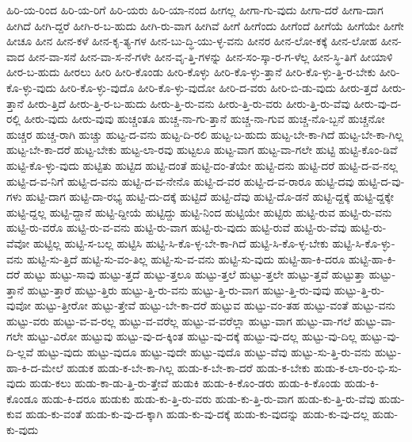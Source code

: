 {ಹಿರಿ-ಯ-ರಿಂದ
ಹಿರಿ-ಯ-ರಿಗೆ
ಹಿರಿ-ಯರು
ಹಿರಿ-ಯಾ-ನಂದ
ಹೀಗಲ್ಲ
ಹೀಗಾ-ಗು-ವುದು
ಹೀಗಾ-ದರೆ
ಹೀಗಾ-ದಾಗ
ಹೀಗಿದೆ
ಹೀಗಿ-ದ್ದರೆ
ಹೀಗಿ-ರ-ಬ-ಹುದು
ಹೀಗಿ-ರು-ವಾಗ
ಹೀಗಿವೆ
ಹೀಗೆ
ಹೀಗೆಂದು
ಹೀಗೆಂದೆ
ಹೀಗೆಯೆ
ಹೀಗೆಯೇ
ಹೀಗೇ
ಹೀಚೂ
ಹೀನ
ಹೀನ-ಕಳೆ
ಹೀನ-ಕೃ-ತ್ಯ-ಗಳ
ಹೀನ-ಬು-ದ್ಧಿ-ಯು-ಳ್ಳ-ವನು
ಹೀನರ
ಹೀನ-ಲೋ-ಕಕ್ಕೆ
ಹೀನ-ಲೋಹ
ಹೀನ-ವಾದ
ಹೀನ-ವಾ-ಸನೆ
ಹೀನ-ವಾ-ಸ-ನೆ-ಗಳೇ
ಹೀನ-ವೃ-ತ್ತಿ-ಗಳನ್ನು
ಹೀನ-ಸಂ-ಸ್ಕಾ-ರ-ಗ-ಳೆಲ್ಲ
ಹೀನ-ಸ್ಥಿ-ತಿಗೆ
ಹೀಯಾಳಿ
ಹೀರ-ಬ-ಹುದು
ಹೀರಲು
ಹೀರಿ
ಹೀರಿ-ಕೊಂಡು
ಹೀರಿ-ಕೊಳ್ಳು
ಹೀರಿ-ಕೊ-ಳ್ಳು-ತ್ತಾನೆ
ಹೀರಿ-ಕೊ-ಳ್ಳು-ತ್ತಿ-ರ-ಬೇಕು
ಹೀರಿ-ಕೊ-ಳ್ಳು-ವುದು
ಹೀರಿ-ಕೊ-ಳ್ಳು-ವುದೊ
ಹೀರಿ-ಕೊ-ಳ್ಳು-ವುದೋ
ಹೀರಿ-ದ-ವರು
ಹೀರಿ-ಬಿ-ಡು-ವುದು
ಹೀರು-ತ್ತದೆ
ಹೀರು-ತ್ತಾನೆ
ಹೀರು-ತ್ತಿದೆ
ಹೀರು-ತ್ತಿ-ರ-ಬ-ಹುದು
ಹೀರು-ತ್ತಿ-ರು-ವನು
ಹೀರು-ತ್ತಿ-ರು-ವರು
ಹೀರು-ತ್ತಿ-ರು-ವೆವು
ಹೀರು-ವು-ದ-ರಲ್ಲಿ
ಹೀರು-ವುದು
ಹೀರು-ವುವು
ಹುಚ್ಚಂತೂ
ಹುಚ್ಚ-ನಾ-ಗು-ತ್ತಾನೆ
ಹುಚ್ಚ-ನಾ-ಗುವ
ಹುಚ್ಚ-ನೊ-ಬ್ಬನೆ
ಹುಚ್ಚನೋ
ಹುಚ್ಚರ
ಹುಚ್ಚ-ರಾಗಿ
ಹುಚ್ಚು
ಹುಟ್ಟ-ದ-ವನು
ಹುಟ್ಟ-ದಿ-ರಲಿ
ಹುಟ್ಟ-ಬ-ಹುದು
ಹುಟ್ಟ-ಬೇ-ಕಾ-ಗಿದೆ
ಹುಟ್ಟ-ಬೇ-ಕಾ-ಗಿಲ್ಲ
ಹುಟ್ಟ-ಬೇ-ಕಾ-ದರೆ
ಹುಟ್ಟ-ಬೇಕು
ಹುಟ್ಟ-ಲಾ-ರವು
ಹುಟ್ಟಲೂ
ಹುಟ್ಟ-ವಾಗ
ಹುಟ್ಟ-ವಾ-ಗಲೇ
ಹುಟ್ಟಿ
ಹುಟ್ಟಿ-ಕೊಂ-ಡಿವೆ
ಹುಟ್ಟಿ-ಕೊ-ಳ್ಳು-ವುದು
ಹುಟ್ಟಿತು
ಹುಟ್ಟಿದ
ಹುಟ್ಟಿ-ದಂತೆ
ಹುಟ್ಟಿ-ದಂ-ತೆಯೇ
ಹುಟ್ಟಿ-ದನು
ಹುಟ್ಟಿ-ದರೆ
ಹುಟ್ಟಿ-ದ-ವ-ನಲ್ಲ
ಹುಟ್ಟಿ-ದ-ವ-ನಿಗೆ
ಹುಟ್ಟಿ-ದ-ವನು
ಹುಟ್ಟಿ-ದ-ವ-ನೇನೊ
ಹುಟ್ಟಿ-ದ-ವರ
ಹುಟ್ಟಿ-ದ-ವ-ರಾರೂ
ಹುಟ್ಟಿ-ದವು
ಹುಟ್ಟಿ-ದ-ವು-ಗಳು
ಹುಟ್ಟಿ-ದಾಗ
ಹುಟ್ಟಿ-ದಾ-ರಭ್ಯ
ಹುಟ್ಟಿ-ದು-ದಕ್ಕೆ
ಹುಟ್ಟಿದೆ
ಹುಟ್ಟಿ-ದೆವು
ಹುಟ್ಟಿ-ದೊ-ಡನೆ
ಹುಟ್ಟಿ-ದ್ದಕ್ಕೆ
ಹುಟ್ಟಿ-ದ್ದಕ್ಕೇ
ಹುಟ್ಟಿ-ದ್ದಲ್ಲ
ಹುಟ್ಟಿ-ದ್ದಾನೆ
ಹುಟ್ಟಿ-ದ್ದೀಯೆ
ಹುಟ್ಟಿದ್ದು
ಹುಟ್ಟಿ-ನಿಂದ
ಹುಟ್ಟಿಯೇ
ಹುಟ್ಟಿರು
ಹುಟ್ಟಿ-ರುವ
ಹುಟ್ಟಿ-ರು-ವನು
ಹುಟ್ಟಿ-ರು-ವರೊ
ಹುಟ್ಟಿ-ರು-ವ-ವನು
ಹುಟ್ಟಿ-ರು-ವಾಗ
ಹುಟ್ಟಿ-ರು-ವುದು
ಹುಟ್ಟಿ-ರುವೆ
ಹುಟ್ಟಿ-ರು-ವೆವು
ಹುಟ್ಟಿ-ರು-ವೆವೋ
ಹುಟ್ಟಿಲ್ಲ
ಹುಟ್ಟಿ-ಸ-ಬಲ್ಲ
ಹುಟ್ಟಿಸಿ
ಹುಟ್ಟಿ-ಸಿ-ಕೊ-ಳ್ಳ-ಬೇ-ಕಾ-ಗಿದೆ
ಹುಟ್ಟಿ-ಸಿ-ಕೊ-ಳ್ಳ-ಬೇಕು
ಹುಟ್ಟಿ-ಸಿ-ಕೊ-ಳ್ಳು-ವನು
ಹುಟ್ಟಿ-ಸು-ತ್ತಿದೆ
ಹುಟ್ಟಿ-ಸು-ವಂ-ತಿಲ್ಲ
ಹುಟ್ಟಿ-ಸು-ವ-ವನು
ಹುಟ್ಟಿ-ಸು-ವುದು
ಹುಟ್ಟಿ-ಹಾ-ಕಿ-ದರೂ
ಹುಟ್ಟಿ-ಹಾ-ಕಿ-ದರೆ
ಹುಟ್ಟು
ಹುಟ್ಟು-ಸಾವು
ಹುಟ್ಟು-ತ್ತದೆ
ಹುಟ್ಟು-ತ್ತಲೂ
ಹುಟ್ಟು-ತ್ತಲೆ
ಹುಟ್ಟು-ತ್ತಲೇ
ಹುಟ್ಟು-ತ್ತವೆ
ಹುಟ್ಟುತ್ತಾ
ಹುಟ್ಟು-ತ್ತಾನೆ
ಹುಟ್ಟು-ತ್ತಾರೆ
ಹುಟ್ಟು-ತ್ತಿರು
ಹುಟ್ಟು-ತ್ತಿ-ರು-ವನು
ಹುಟ್ಟು-ತ್ತಿ-ರು-ವಾಗ
ಹುಟ್ಟು-ತ್ತಿ-ರು-ವುವು
ಹುಟ್ಟು-ತ್ತಿ-ರು-ವುವೋ
ಹುಟ್ಟು-ತ್ತೀರೋ
ಹುಟ್ಟು-ತ್ತೇವೆ
ಹುಟ್ಟು-ಬೇ-ಕಾ-ದರೆ
ಹುಟ್ಟುವ
ಹುಟ್ಟು-ವಂ-ತಹ
ಹುಟ್ಟು-ವಂತೆ
ಹುಟ್ಟು-ವನು
ಹುಟ್ಟು-ವರು
ಹುಟ್ಟು-ವ-ವ-ರಲ್ಲ
ಹುಟ್ಟು-ವ-ವರೆಲ್ಲ
ಹುಟ್ಟು-ವ-ವರೆಲ್ಲಾ
ಹುಟ್ಟು-ವಾಗ
ಹುಟ್ಟು-ವಾ-ಗಲೆ
ಹುಟ್ಟು-ವಾ-ಗಲೇ
ಹುಟ್ಟು-ವಿರೋ
ಹುಟ್ಟುವು
ಹುಟ್ಟು-ವು-ದ-ಕ್ಕಿಂತ
ಹುಟ್ಟು-ವು-ದಕ್ಕೆ
ಹುಟ್ಟು-ವು-ದಲ್ಲ
ಹುಟ್ಟು-ವು-ದಿಲ್ಲ
ಹುಟ್ಟು-ವು-ದಿ-ಲ್ಲವೆ
ಹುಟ್ಟು-ವುದು
ಹುಟ್ಟು-ವುದೂ
ಹುಟ್ಟು-ವುದೇ
ಹುಟ್ಟು-ವುದೊ
ಹುಟ್ಟು-ವೆವು
ಹುಟ್ಟು-ಸು-ತ್ತಿ-ರು-ವನು
ಹುಟ್ಟು-ಹಾ-ಕಿ-ದ-ಮೇಲೆ
ಹುಡುಕ
ಹುಡು-ಕ-ಬೇ-ಕಾ-ಗಿಲ್ಲ
ಹುಡು-ಕ-ಬೇ-ಕಾ-ದರೆ
ಹುಡು-ಕ-ಬೇಕು
ಹುಡು-ಕ-ಲಾ-ರಂ-ಭಿ-ಸು-ವುದು
ಹುಡು-ಕಲು
ಹುಡು-ಕಾ-ಡು-ತ್ತಿ-ರು-ತ್ತೇವೆ
ಹುಡುಕಿ
ಹುಡು-ಕಿ-ಕೊಂ-ಡರು
ಹುಡು-ಕಿ-ಕೊಂಡು
ಹುಡು-ಕಿ-ಕೊಂಡೂ
ಹುಡು-ಕಿ-ದರೂ
ಹುಡುಕು
ಹುಡು-ಕು-ತ್ತಿ-ರು-ವರು
ಹುಡು-ಕು-ತ್ತಿ-ರು-ವಾಗ
ಹುಡು-ಕು-ತ್ತಿ-ರು-ವೆವು
ಹುಡು-ಕುವ
ಹುಡು-ಕು-ವಂತೆ
ಹುಡು-ಕು-ವು-ದ-ಕ್ಕಾಗಿ
ಹುಡು-ಕು-ವು-ದಕ್ಕೆ
ಹುಡು-ಕು-ವುದನ್ನು
ಹುಡು-ಕು-ವು-ದಲ್ಲ
ಹುಡು-ಕು-ವುದು
}
